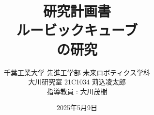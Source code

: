\documentclass[uplatex,twocolumn]{jsarticle}
\begin{document}
 
\title{\large 研究計画書\\
\huge ルービックキューブ\\ の研究}
\author{千葉工業大学 先進工学部 未来ロボティクス学科\\
大川研究室 21C1034 苅込凌太郎\\
\small 指導教員 : 大川茂樹}
\date{2025年5月9日} 
\maketitle









\end{document}
